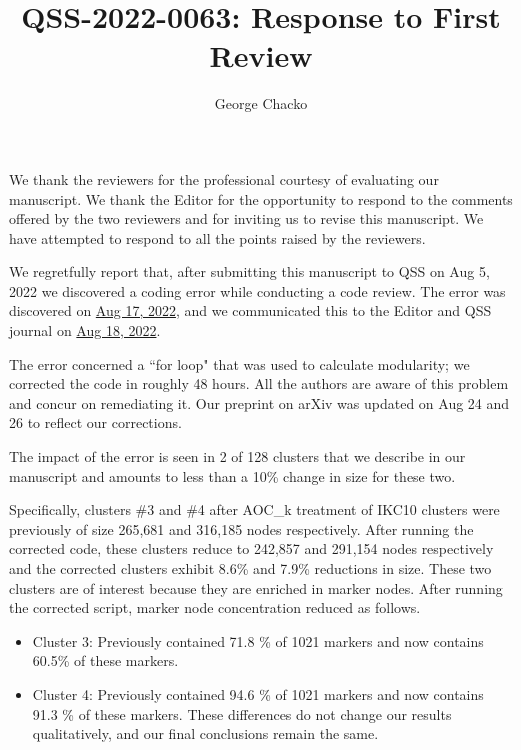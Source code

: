 \documentclass[11pt, oneside]{article}   	%
\title{QSS-2022-0063: Response to First Review}
\author{George Chacko}
\begin{document}
\maketitle
\section*{}

We thank the reviewers for the professional courtesy of evaluating our manuscript. We thank the Editor for the opportunity to respond to the comments 
offered by the two reviewers and for inviting us to revise this manuscript. We have attempted to respond to all the points raised by the reviewers.

We regretfully report that, after submitting this manuscript to QSS on Aug 5, 2022 we discovered a coding error while conducting a code review. The error was discovered 
on \underline{Aug 17, 2022},  and we communicated this to the Editor and QSS journal on \underline{Aug 18, 2022}. 

The error concerned a ``for loop" that was used to calculate modularity; we corrected the code in roughly 48 hours. All the authors are aware of this problem and 
concur on remediating it. Our preprint on arXiv was updated on Aug 24 and 26 to reflect our corrections. 

The impact of the error is seen in 2 of 128 clusters  that we describe in our manuscript and amounts to less than a 10\% change in size for these two.
 
Specifically, clusters \#3 and \#4 after AOC\_k treatment of IKC10 clusters were previously of size 265,681 and 316,185 nodes respectively. After running the corrected code, these
clusters reduce to 242,857 and 291,154 nodes respectively and the corrected clusters exhibit 8.6\% and 7.9\% reductions in size. These two clusters are of interest because 
they are  enriched in marker nodes. After running the corrected script, marker node concentration reduced as follows. 


\begin{itemize}
\item Cluster 3: Previously contained 71.8 \% of 1021 markers and now contains 60.5\% of these markers.
\item Cluster 4: Previously contained 94.6 \% of 1021 markers and now contains 91.3 \% of these markers. These differences do not change our results qualitatively, and our final conclusions remain the same. 
\end{itemize}
\end{document}
